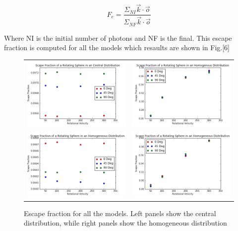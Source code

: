 \documentclass{article}
\theoremstyle{definition}
\theoremstyle{remark}
\begin{document}
\begin{equation}
F_{e}=\dfrac{\Sigma_{NI} \vec{k}\cdot \vec{o}}{\Sigma_{NF}\vec{k}\cdot \vec{o}}
\end{equation}

Where NI is the initial number of photons and NF is the final. This
escape fraction is computed for all the models which resaults are
shown in Fig.[6]\\ 
 
\begin{figure}[H]

  \centering

  \label{figur}\caption{Escape fraction for all the models. Left
    panels show the central distribution, while right panels show the
    homogeneous distribution} 

  \begin{tabular}{cc}

    
    \includegraphics[width=60mm]{FECentral5.png}&

    \includegraphics[width=60mm]{FEHOM5.png}\\

    \includegraphics[width=60mm]{FECentral6.png}&

    \includegraphics[width=60mm]{FEHOM6.png}\\


\end{tabular}
\end{figure}
\end{document}
